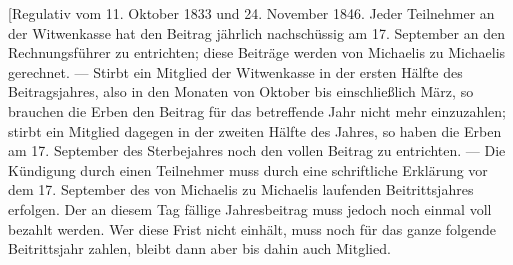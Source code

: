\noindent\hspace*{1.2em} [Regulativ vom 11. Oktober 1833 und 24. November 1846. Jeder Teilnehmer an der Witwenkasse hat den Beitrag jährlich nachschüssig am 17. September an den Rechnungsführer zu entrichten; diese Beiträge werden von Michaelis zu Michaelis gerechnet. — Stirbt ein Mitglied der Witwenkasse in der ersten Hälfte des Beitragsjahres, also in den Monaten von Oktober bis einschließlich März, so brauchen die Erben den Beitrag für das betreffende Jahr nicht mehr einzuzahlen; stirbt ein Mitglied dagegen in der zweiten Hälfte des Jahres, so haben die Erben am 17. September des Sterbejahres noch den vollen Beitrag zu entrichten. — Die Kündigung durch einen Teilnehmer muss durch eine schriftliche Erklärung vor dem 17. September des von Michaelis zu Michaelis laufenden Beitrittsjahres erfolgen. Der an diesem Tag fällige Jahresbeitrag muss jedoch noch einmal voll bezahlt werden. Wer diese Frist nicht einhält, muss noch für das ganze folgende Beitrittsjahr zahlen, bleibt dann aber bis dahin auch Mitglied.

